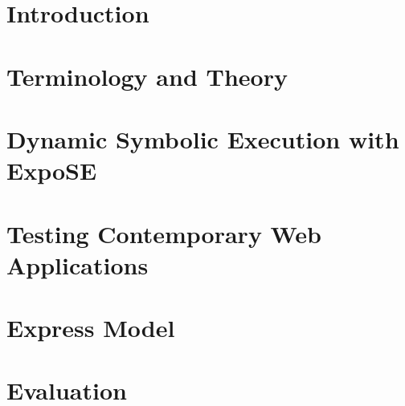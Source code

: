 \documentclass[thesis]{plai}
\begin{document}
\vspace{1,5cm}







\newpage
\tableofcontents
{}
\pagestyle{fancy}
\fancyhf{}
\fancyhead[LO]{\leftmark}
\fancyhead[RO, LE]{\thepage}
\fancyhead[RE]{\rightmark}
\renewcommand{\headrulewidth}{0pt}



\chapter{Introduction}
\label{chapter:introduction}


\chapter{Terminology and Theory}
\label{chapter:background}


\chapter{Dynamic Symbolic Execution with ExpoSE}
\label{chapter:techstack}


\chapter{Testing Contemporary Web Applications}
\label{chapter:implementation}


\chapter{Express Model}
\label{chapter:express}


\chapter{Evaluation}
\label{chapter:evaluation}

\end{document}

